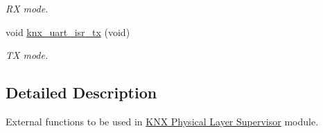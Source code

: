 \begin{DoxyCompactItemize}
\begin{DoxyCompactList}\small\item\em RX mode. \end{DoxyCompactList}\item 
void \hyperlink{group___k_n_x___p_h___t_p_uart___external___functions_ga25d5c961e17de3ba8faff2175f245947}{knx\+\_\+uart\+\_\+isr\+\_\+tx} (void)\hypertarget{group___k_n_x___p_h___t_p_uart___external___functions_ga25d5c961e17de3ba8faff2175f245947}{}\label{group___k_n_x___p_h___t_p_uart___external___functions_ga25d5c961e17de3ba8faff2175f245947}

\begin{DoxyCompactList}\small\item\em TX mode. \end{DoxyCompactList}\end{DoxyCompactItemize}


\subsection{Detailed Description}
External functions to be used in \hyperlink{group___k_n_x___p_h___sup}{K\+NX Physical Layer Supervisor} module. 

